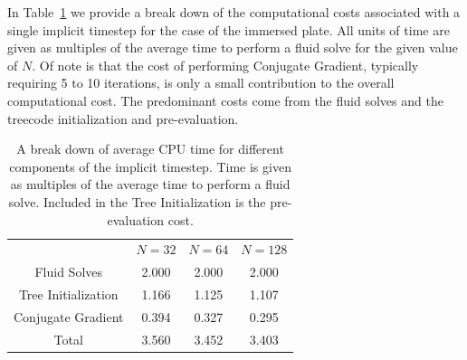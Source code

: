 \documentclass[preprint,12pt]{elsarticle}
\begin{document}
In Table~\ref{table:ImplictTimeBreakdown} we provide a break down of the computational costs associated with a single implicit timestep for the case of the immersed plate. All units of time are given as multiples of the average time to perform a fluid solve for the given value of $N$. Of note is that the cost of performing Conjugate Gradient, typically requiring 5 to 10 iterations, is only a small contribution to the overall computational cost. The predominant costs come from the fluid solves and the treecode initialization and pre-evaluation.
\begin{table}
\caption{A break down of average CPU time for different components of the implicit timestep. Time is given as multiples of the average time to perform a fluid solve. Included in the Tree Initialization is the pre-evaluation cost.}
\label{table:ImplictTimeBreakdown}
\begin{center}

\begin{tabular}{c c c c}
\rule{0cm}{2.2ex}
& $N=32$ & $N=64$ & $N=128$\\
\cline{2-4}
\rule{0cm}{2.25ex}
Fluid Solves  & 2.000 & 2.000 & 2.000 \\
Tree Initialization & 1.166 & 1.125 & 1.107 \\
Conjugate Gradient            & 0.394 & 0.327 & 0.295 \\
Total         & 3.560 & 3.452 & 3.403 \\
\end{tabular}

\end{center}
\end{table}
\end{document}
